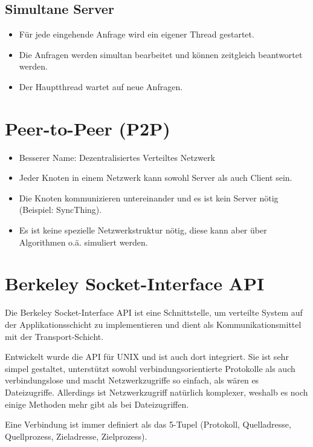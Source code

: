 		\subsection{Simultane Server}
			\begin{itemize}
				\item Für jede eingehende Anfrage wird ein eigener Thread gestartet.
				\item Die Anfragen werden simultan bearbeitet und können zeitgleich beantwortet werden.
				\item Der Hauptthread wartet auf neue Anfragen.
			\end{itemize}

	\section{Peer-to-Peer (P2P)}
		\begin{itemize}
			\item Besserer Name: Dezentralisiertes Verteiltes Netzwerk
			\item Jeder Knoten in einem Netzwerk kann sowohl Server als auch Client sein.
			\item Die Knoten kommunizieren untereinander und es ist kein Server nötig (Beispiel: SyncThing).
			\item Es ist keine spezielle Netzwerkstruktur nötig, diese kann aber über Algorithmen o.ä. simuliert werden.
		\end{itemize}

	\section{Berkeley Socket-Interface API}
		Die Berkeley Socket-Interface API ist eine Schnittstelle, um verteilte System auf der Applikationsschicht zu implementieren und dient als Kommunikationsmittel mit der Transport-Schicht.

		Entwickelt wurde die API für UNIX und ist auch dort integriert. Sie ist sehr simpel gestaltet, unterstützt sowohl verbindungsorientierte Protokolle als auch verbindungslose und macht Netzwerkzugriffe so einfach, als wären es Dateizugriffe. Allerdings ist Netzwerkzugriff natürlich komplexer, weshalb es noch einige Methoden mehr gibt als bei Dateizugriffen.

		Eine Verbindung ist immer definiert als das 5-Tupel (Protokoll, Quelladresse, Quellprozess, Zieladresse, Zielprozess).

